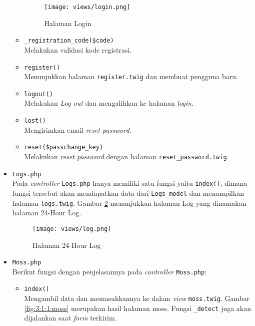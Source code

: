\begin{itemize}
\begin{itemize}
		            \begin{figure}[H]
			            \centering
			            \texttt{[image: views/login.png]}
			            \caption{Halaman Login}
			            \label{fig:3:1:1:login}
		            \end{figure}
		      \item \verb|_registration_code($code)| \\
		            Melakukan validasi kode registrasi.
		      \item \verb|register()| \\
		            Menunjukkan halaman \verb|register.twig| dan membuat pengguna baru.
		      \item \verb|logout()| \\
		            Melakukan \textit{Log out} dan mengalihkan ke halaman \textit{login}.
		      \item \verb|lost()| \\
		            Mengirimkan email \textit{reset password}.
		      \item \verb|reset($passchange_key)| \\
		            Melakukan \textit{reset password} dengan halaman \verb|reset_password.twig|.

	      \end{itemize}

	\item \verb|Logs.php| \\
	      Pada \textit{controller} \verb|Logs.php| hanya memiliki satu fungsi yaitu \verb|index()|, dimana fungsi tersebut akan mendapatkan data dari \verb|Logs_model| dan menampilkan halaman \verb|logs.twig|. Gambar \ref{fig:3:1:1:log} menunjukkan halaman Log yang dinamakan halaman 24-Hour Log.

	      \begin{figure}[H]
		      \centering
		      \texttt{[image: views/log.png]}
		      \caption{Halaman 24-Hour Log}
		      \label{fig:3:1:1:log}
	      \end{figure}


	\item \verb|Moss.php| \\
	      Berikut fungsi dengan penjelasannya pada \textit{controller} \verb|Moss.php|:

	      \begin{itemize}
		      \item \verb|index()| \\
		            Mengambil data dan memasukkannya ke dalam \textit{view} \verb|moss.twig|. Gambar \ref{fig:3:1:1:moss} merupakan hasil halaman moss. Fungsi \verb|_detect| juga akan dijalankan saat \textit{form} terkirim.


\end{itemize}
\end{itemize}
